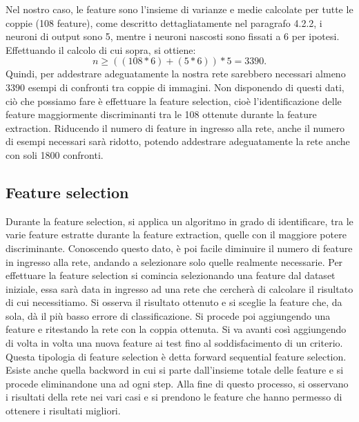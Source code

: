 \documentclass[a4paper,11pt]{article}
\begin{document}
    Nel nostro caso, le feature sono l'insieme di varianze e medie calcolate per tutte le coppie (108 feature), come descritto dettagliatamente nel paragrafo 4.2.2, i neuroni di output sono 5, mentre i neuroni nascosti sono fissati a 6 per ipotesi.
    Effettuando il calcolo di cui sopra, si ottiene: 
    $$ n \geq ((108*6)+(5*6))*5 = 3390.$$
    Quindi, per addestrare adeguatamente la nostra rete sarebbero necessari almeno 3390 esempi  di confronti tra coppie di immagini.
    Non disponendo di questi dati, ciò che possiamo fare è effettuare la feature selection, cioè l'identificazione delle feature maggiormente discriminanti tra le 108 ottenute durante la feature extraction.
    Riducendo il numero di feature in ingresso alla rete, anche il numero di esempi necessari sarà ridotto, potendo addestrare adeguatamente la rete anche con soli 1800 confronti.
    \subsection{Feature selection}
    Durante la feature selection, si applica un algoritmo in grado di identificare, tra le varie feature estratte durante la feature extraction, quelle con il maggiore potere discriminante.
    Conoscendo questo dato, è poi facile diminuire il numero di feature in ingresso alla rete, andando a selezionare solo quelle realmente necessarie. 
    Per effettuare la feature selection si comincia selezionando una feature dal dataset iniziale, essa sarà data in ingresso ad una rete che cercherà di calcolare il risultato di cui necessitiamo.
    Si osserva il risultato ottenuto e si sceglie la feature che, da sola, dà il più basso errore di classificazione. Si procede poi aggiungendo una feature e ritestando la rete con la coppia ottenuta. Si va avanti così aggiungendo di volta in volta una nuova feature ai test fino al soddisfacimento di un criterio.
    Questa tipologia di feature selection è detta forward sequential feature selection. Esiste anche quella backword in cui si parte dall'insieme totale delle feature e si procede eliminandone una ad ogni step.
    Alla fine di questo processo, si osservano i risultati della rete nei vari casi e si prendono le feature che hanno permesso di ottenere i risultati migliori.
    \newpage
\end{document}
